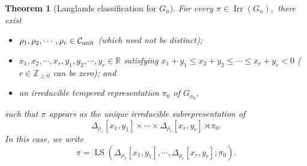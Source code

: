 \documentclass[11pt,letterpaper]{amsart}
\theoremstyle{plain}
\newcounter{theorem}[section]
\numberwithin{theorem}{section}
\numberwithin{equation}{subsection}
\newtheorem{Thm}[theorem]{Theorem}
\theoremstyle{remark}
\newcommand{\Irr}{\operatorname{Irr}}
\newcommand{\LS}{\operatorname{LS}} %
\newcommand{\Z}{\mathbb{Z}}
\newcommand{\R}{\mathbb{R}}
\newcommand{\unit}{{\rm unit}}
\def\calC{\mathcal{C}}
\begin{document}
\begin{Thm}[Langlands classification for \(G_n\)]\label{lcgn}
    For every \(\pi\in\Irr(G_n),\) there exist
    \begin{itemize}
        \item \(\rho_1,\rho_2,\cdots,\rho_r\in\calC_{\unit}\) (which need not be distinct);

        \vskip 5pt

        \item \(x_1,x_2,\cdots,x_r,y_1,y_2,\cdots,y_r\in\R\) satisfying \(x_1+y_1\leq x_2+y_2\leq\cdots \leq x_r+y_r<0\) ($r\in\Z_{\geq0}$ can be zero); and

        \vskip 5pt

        \item an irreducible tempered representation \(\pi_0\) of \(G_{n_0}\),
    \end{itemize}
    such that \(\pi\) appears as the unique irreducible subrepresentation of 
    \[
        \Delta_{\rho_1}[x_1,y_1]\times\cdots\times\Delta_{\rho_r}[x_r,y_r]\rtimes\pi_0.
    \] 
    In this case, we write 
    \[
        \pi=\LS(\Delta_{\rho_1}[x_1,y_1],\cdots,\Delta_{\rho_r}[x_r,y_r];\pi_0).
    \]
\end{Thm}

\vskip 5pt
\end{document}
